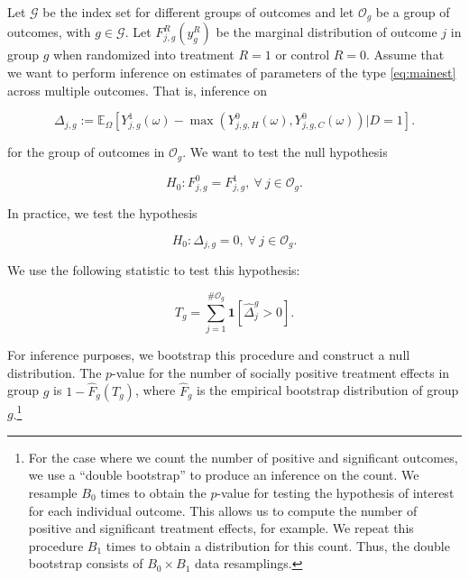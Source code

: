 \noindent Let $\mathcal{G}$ be the index set for different groups of outcomes and let $\mathcal{O}_{g}$ be a group of outcomes, with $g \in \mathcal{G}$. Let $F_{j,g}^R \left( y_g^R\right) $ be the marginal distribution of outcome $j$ in group $g$ when randomized into treatment $R = 1$ or control $R = 0$. Assume that we want to perform inference on estimates of parameters of the type \eqref{eq:mainest} across multiple outcomes. That is, inference on 

\begin{equation}
\Delta_{j,g} := \mathbb{E}_{\Omega} \left[ Y_{j,g}^1 \left( \omega \right) -  \max \left(  Y_{j,g,H}^0 \left( \omega \right) ,  Y_{j,g,C}^0 \left( \omega \right)  \right) | D =1 \right]. 
\end{equation}

\noindent for the group of outcomes in $\mathcal{O}_{g}$. We want to test the null hypothesis 


\begin{equation}
H_{0} : F_{j,g}^0 = F_{j,g}^1, \ \forall \ j \in \mathcal{O}_{g}. 
\end{equation}

\noindent In practice, we test the hypothesis  

\begin{equation}
H_{0} : \Delta_{j,g} = 0, \ \forall \ j \in \mathcal{O}_{g}. 
\end{equation}

\noindent We use the following statistic to test this hypothesis: 

\begin{equation}
T_{g} = \sum _{j=1}^{\# \mathcal{O}_g} \mathbf{1} \left[ \widehat{\Delta}_{j}^{g} > 0\right]. \label{eq:count}
\end{equation} 

\noindent For inference purposes, we bootstrap this procedure and construct a null distribution. The $p$-value for the number of socially positive treatment effects in group $g$ is $1 - \widehat{F}_{g} \left( T_{g} \right)$, where $ \widehat{F}_{g}$ is the empirical bootstrap distribution of group $g$.\footnote{For the case where we count the number of positive and significant outcomes, we use a ``double bootstrap'' to produce an inference on the count. We resample $B_{0}$ times to obtain the $p$-value for testing the hypothesis of interest for each individual outcome. This allows us to compute the number of positive and significant treatment effects, for example. We repeat this procedure $B_{1}$ times to obtain a distribution for this count. Thus, the double bootstrap consists of $B_{0} \times B_{1}$ data resamplings.}\\

